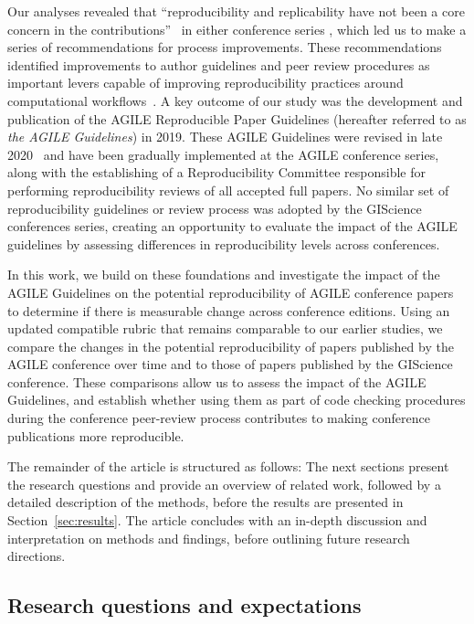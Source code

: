 \documentclass{josis}
\begin{document}
Our analyses revealed that ``reproducibility and replicability have not been a core concern in the contributions''~\cite[pp 2:2]{ostermann2021} in either conference series \cite{nust2018, ostermann2021}, which led us to make a series of recommendations for process improvements.
These recommendations identified improvements to author guidelines and peer review procedures as important levers capable of improving reproducibility practices around computational workflows~\cite{DiCosmo2025}.
A key outcome of our study \cite{nust2018} was the development and publication of the AGILE Reproducible Paper Guidelines (hereafter referred to as \textit{the AGILE Guidelines}) in 2019.
These AGILE Guidelines were revised in late 2020~\cite{nust2020_guidelines} and have been gradually implemented at the AGILE conference series, along with the establishing of a Reproducibility Committee responsible for performing reproducibility reviews of all accepted full papers.
No similar set of reproducibility guidelines or review process was adopted by the GIScience conferences series, creating an opportunity to evaluate the impact of the AGILE guidelines by assessing differences in reproducibility levels across conferences. 

In this work, we build on these foundations and investigate the impact of the AGILE Guidelines on the potential reproducibility of AGILE conference papers to determine if there is measurable change across conference editions.
Using an updated compatible rubric that remains comparable to our earlier studies, we compare the changes in the potential reproducibility of papers published by the AGILE conference over time and to those of papers published by the GIScience conference.
These comparisons allow us to assess the impact of the AGILE Guidelines, and establish whether using them as part of code checking procedures during the conference peer-review process contributes to making conference publications more reproducible.

The remainder of the article is structured as follows: The next sections present the research questions and provide an overview of related work, followed by a detailed description of the methods, before the results are presented in Section~\ref{sec:results}. The article concludes with an in-depth discussion and interpretation on methods and findings, before outlining future research directions.

\subsection{Research questions and expectations}
\label{sec:methods:questions}
\end{document}
